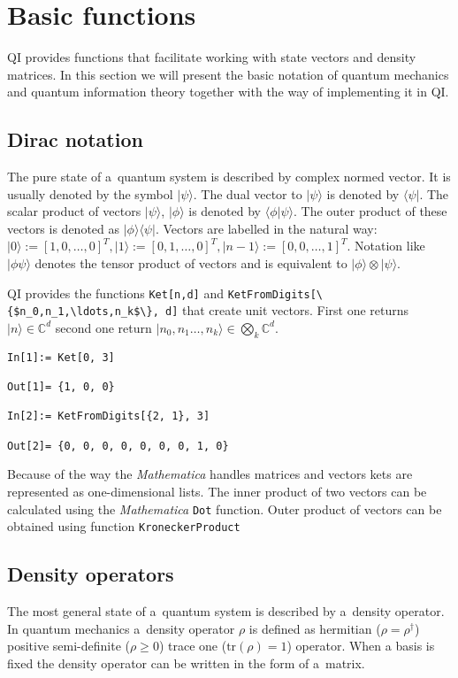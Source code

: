 \documentclass[a4paper,11pt]{elsart}
\newcommand{\ket}[1]{\ensuremath{|#1\rangle}}
\newcommand{\bra}[1]{\ensuremath{\langle#1|}}
\newcommand{\Mathematica}{\emph{Mathematica}}
\newcommand{\1}{{\rm 1\hspace{-0.9mm}l}}
\newcommand{\tr}{\mathrm{tr}}
\newcommand{\qi}{QI}
\newcommand{\Cplx}{\ensuremath{\mathbb{C}}}
\newcommand{\ketbra}[2]{\ensuremath{\ket{#1}\bra{#2}}}
\newcommand{\braket}[2]{\ensuremath{\langle#1|#2\rangle}}
\begin{document}
\section{Basic functions}\label{sec:basic}
\qi{} provides functions that facilitate working with state vectors and 
density matrices. In this section we will present the basic notation of 
quantum mechanics and quantum information theory together with the way of 
implementing it in \qi.

\subsection{Dirac notation}
The pure state of a~quantum system is described by complex normed vector. It 
is usually denoted by the symbol $\ket{\psi}$. The dual vector to $\ket{\psi}$
is denoted by $\bra{\psi}$. The scalar product of vectors $\ket{\psi}$, 
$\ket{\phi}$ is denoted by $\braket{\phi}{\psi}$. The outer product 
of these vectors is denoted as $\ketbra{\phi}{\psi}.$ 
Vectors are labelled in the natural way: 
$\ket{0}:=\left[1,0,\ldots,0\right]^T, 
\ket{1}:=\left[0,1,\ldots,0\right]^T,\ket{n-1}:=\left[0,0,\ldots,1\right]^T$.
Notation like $\ket{\phi\psi}$ denotes the tensor product of vectors and is
equivalent to $\ket{\phi}\otimes\ket{\psi}$.

\qi{} provides the functions \lstinline!Ket[n,d]! and
\lstinline!KetFromDigits[\{$n_0,n_1,\ldots,n_k$\}, d]! that 
create unit vectors. First one returns $\ket{n}\in\Cplx^d$ second one return 
$\ket{n_0,n_1\ldots,n_k}\in\bigotimes_k\Cplx^d$.
\begin{lstlisting}
In[1]:= Ket[0, 3]

Out[1]= {1, 0, 0}

In[2]:= KetFromDigits[{2, 1}, 3]

Out[2]= {0, 0, 0, 0, 0, 0, 0, 1, 0}
\end{lstlisting}
Because of the way the \Mathematica{} handles matrices and vectors kets are 
represented as one-dimensional lists. The inner product of two vectors can be 
calculated using the \Mathematica{} \lstinline!Dot! function. Outer product of 
vectors can be obtained using function \lstinline!KroneckerProduct!

\subsection{Density operators}
The most general state of a~quantum system is described by a~density operator.
In quantum mechanics a~density operator $\rho$ is defined as hermitian
($\rho=\rho^\dagger$) positive semi-definite ($\rho\geq 0$) trace one
($\tr{(\rho)}=1$) operator. When a basis is fixed the density operator can be
written in the form of a~matrix. 
\end{document}
